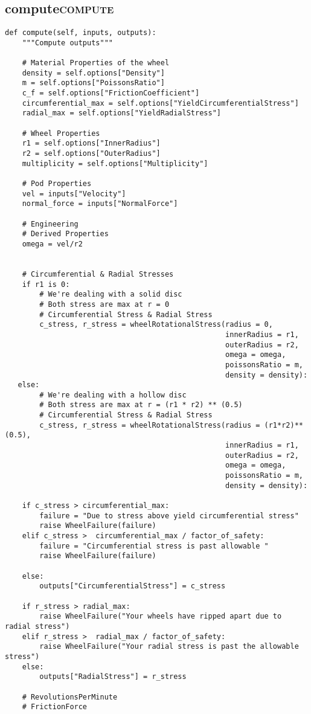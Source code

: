 \documentclass[11pt]{article}
\begin{document}
\subsection{compute\hfill{}\textsc{compute}}
\label{sec:org81cca86}
\begin{verbatim}
def compute(self, inputs, outputs):
    """Compute outputs"""

    # Material Properties of the wheel
    density = self.options["Density"]
    m = self.options["PoissonsRatio"]
    c_f = self.options["FrictionCoefficient"]
    circumferential_max = self.options["YieldCircumferentialStress"]
    radial_max = self.options["YieldRadialStress"]

    # Wheel Properties
    r1 = self.options["InnerRadius"]
    r2 = self.options["OuterRadius"]
    multiplicity = self.options["Multiplicity"]

    # Pod Properties
    vel = inputs["Velocity"]
    normal_force = inputs["NormalForce"]

    # Engineering 
    # Derived Properties
    omega = vel/r2


    # Circumferential & Radial Stresses
    if r1 is 0:
        # We're dealing with a solid disc
        # Both stress are max at r = 0
        # Circumferential Stress & Radial Stress
        c_stress, r_stress = wheelRotationalStress(radius = 0,    
                                                   innerRadius = r1,           
                                                   outerRadius = r2,
                                                   omega = omega,
                                                   poissonsRatio = m,
                                                   density = density):
   else:
        # We're dealing with a hollow disc
        # Both stress are max at r = (r1 * r2) ** (0.5)
        # Circumferential Stress & Radial Stress
        c_stress, r_stress = wheelRotationalStress(radius = (r1*r2)**(0.5),    
                                                   innerRadius = r1,           
                                                   outerRadius = r2,
                                                   omega = omega,
                                                   poissonsRatio = m,
                                                   density = density):

    if c_stress > circumferential_max:
        failure = "Due to stress above yield circumferential stress"
        raise WheelFailure(failure)
    elif c_stress >  circumferential_max / factor_of_safety:
        failure = "Circumferential stress is past allowable "
        raise WheelFailure(failure)

    else:
        outputs["CircumferentialStress"] = c_stress

    if r_stress > radial_max:
        raise WheelFailure("Your wheels have ripped apart due to radial stress")
    elif r_stress >  radial_max / factor_of_safety:
        raise WheelFailure("Your radial stress is past the allowable stress")
    else:
        outputs["RadialStress"] = r_stress

    # RevolutionsPerMinute
    # FrictionForce
\end{verbatim}
\end{document}
